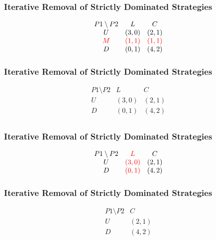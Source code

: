\begin{frame}
    \frametitle{Iterative Removal of Strictly Dominated Strategies}
    \begin{equation*}
        \begin{matrix}
            P1\setminus P2 & L & C \\
            U & (3,0) & (2,1) \\
            \textcolor{red}{M} & \textcolor{red}{(1,1)} & \textcolor{red}{(1,1)} \\
            D & (0,1) & (4,2) \\
        \end{matrix}
    \end{equation*}
\end{frame}


\begin{frame}
    \frametitle{Iterative Removal of Strictly Dominated Strategies}
    \begin{equation*}
        \begin{matrix}
            P1\setminus P2 & L & C \\
            U & (3,0) & (2,1) \\
            D & (0,1) & (4,2) \\
        \end{matrix}
    \end{equation*}
\end{frame}


\begin{frame}
    \frametitle{Iterative Removal of Strictly Dominated Strategies}
    \begin{equation*}
        \begin{matrix}
            P1\setminus P2 & \textcolor{red}{L} & C \\
            U & \textcolor{red}{(3,0)} & (2,1) \\
            D & \textcolor{red}{(0,1)} & (4,2) \\
        \end{matrix}
    \end{equation*}
\end{frame}


\begin{frame}
    \frametitle{Iterative Removal of Strictly Dominated Strategies}
    \begin{equation*}
        \begin{matrix}
            P1\setminus P2 & C \\
            U & (2,1) \\
            D & (4,2) \\
        \end{matrix}
    \end{equation*}
\end{frame}


